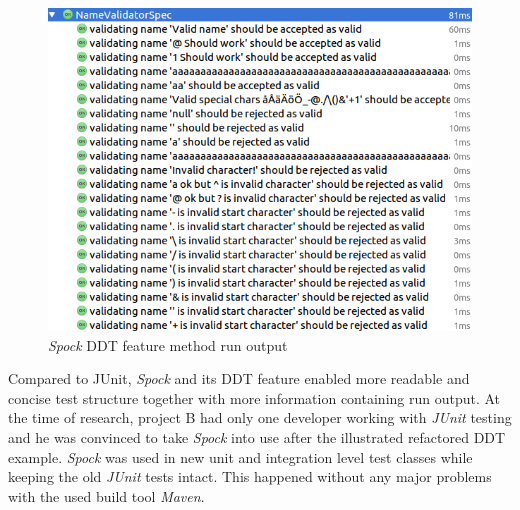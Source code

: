     \clearpage

    \begin{figure}[H]
      \begin{center}
        \begin{topbot}[style=mdstyle]
        \includegraphics[width=\textwidth]{images/spock-validator-results.png}
        \end{topbot}
        \caption{\textit{Spock} DDT feature method run output}
        \label{fig:spock-bit-results}
      \end{center}
    \end{figure}

    Compared to JUnit, \textit{Spock} and its DDT feature enabled more readable and concise test structure together with more information
    containing run output. At the time of research, project B had only one developer working with \textit{JUnit} testing and
    he was convinced to take \textit{Spock} into use after the illustrated refactored DDT example. \textit{Spock} was used in new unit and
    integration level test classes while keeping the old \textit{JUnit} tests intact. This happened without any major
    problems with the used build tool \textit{Maven}.


